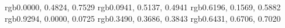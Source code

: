 \documentclass[tikz,border=0pt,12pt]{standalone} %
\begin{document}
	\definecolor{blue50} {rgb}{0.0000, 0.4824, 0.7529}
	\definecolor{turq50} {rgb}{0.0941, 0.5137, 0.4941}
	\definecolor{purp40} {rgb}{0.6196, 0.1569, 0.5882}
	\definecolor{red50}  {rgb}{0.9294, 0.0000, 0.0725}
	\definecolor{gray40} {rgb}{0.3490, 0.3686, 0.3843}%
	\definecolor{gray70} {rgb}{0.6431, 0.6706, 0.7020}%
	
	\newlength{\mywidthA}
	\setlength{\mywidthA}{11.34cm} 		%
	\newlength{\myheightA}
	\setlength{\myheightA}{5.67cm} 		%
	
	\newlength{\mywidthB}
	\setlength{\mywidthB}{12.96cm} 		%
	\newlength{\myheightB}
	\setlength{\myheightB}{8.6832cm} 	%
	
%	
%	
%	
%	
%	
%	
%	
%	
%	
%	
%	
%	
%	
	
\end{document}
